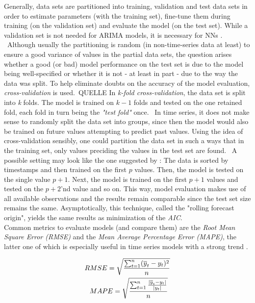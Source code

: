 \documentclass[a4paper, 11pt]{article}
\begin{document}
Generally, data sets are partitioned into training, validation and test data sets in order to estimate parameters (with the training set), fine-tune them during training (on the validation set) and evaluate the model (on the test set). While a validation set is not needed for ARIMA models, it is necessary for NNs \citep{Zhou.2006}. \
Although usually the partitioning is random (in non-time-series data at least) to ensure a good variance of values in the partial data sets, the question arises whether a good (or bad) model performance on the test set is due to the model being well-specified or whether it is not - at least in part - due to the way the data was split. To help eliminate doubts on the accuracy of the model evaluation,  \textit{cross-validation} is used.\ QUELLE
In \textit{k-fold cross-validation}, the data set is split into \textit{k} folds. The model is trained on $k-1$ folds and tested on the one retained fold, each fold in turn being the \textit{"test fold"} once. \
In time series, it does not make sense to randomly split the data set into groups, since then the model would also be trained on future values attempting to predict past values. Using the idea of cross-validation sensibly, one could partition the data set in such a ways that in the training set, only values preciding the values in the test set are found. \
A possible setting may look like the one suggested by \cite{Hyndman.2018}: The data is sorted by timestamps and then trained on the first $p$ values. Then, the model is tested on the single value $p+1$. Next, the model is trained on the first $p+1$ values and tested on the $p+2$'nd value and so on. This way, model evaluation makes use of all available observations and the results remain comparable since the test set size remains the same. Asymptotically, this technique, called the "rolling forecast origin", yields the same results as minimization of the \textit{AIC}. \\
Common metrics to evaluate models (and compare them) are the \textit{Root Mean Square Error (RMSE)} and the \textit{Mean Average Percentage Error (MAPE)}, the latter one of which is especially useful in time series models with a strong trend \citep{Moritz2015ComparisonOD}. 

\begin{align}
	RMSE = \sqrt{\frac{\sum_{t = 1}^{n}(\overline{y}_{t}-y_{t})^2}{n}}\\
	\newline
	MAPE = \sqrt{\frac{\sum_{t = 1}^{n}\frac{|\overline{y}_{t}-y_{t}|}{|y_{t}|}}{n}}\
\end{align}
\end{document}

